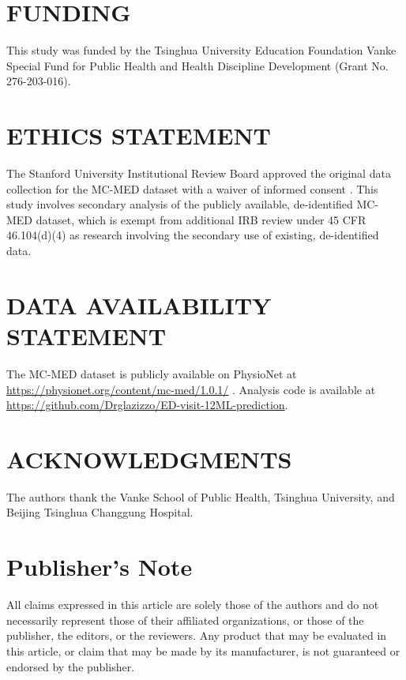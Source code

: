 \documentclass[harvard,article]{frontiersinFPHY_FAMS}
\begin{document}
\section{FUNDING}

This study was funded by the Tsinghua University Education Foundation Vanke Special Fund for Public Health and Health Discipline Development (Grant No. 276-203-016).

\section{ETHICS STATEMENT}

The Stanford University Institutional Review Board approved the original data collection for the MC-MED dataset with a waiver of informed consent \cite{kansal2025}. This study involves secondary analysis of the publicly available, de-identified MC-MED dataset, which is exempt from additional IRB review under 45 CFR 46.104(d)(4) as research involving the secondary use of existing, de-identified data.

\section{DATA AVAILABILITY STATEMENT}

The MC-MED dataset is publicly available on PhysioNet at \url{https://physionet.org/content/mc-med/1.0.1/} \cite{kansal2025}. Analysis code is available at \url{https://github.com/Drglazizzo/ED-visit-12ML-prediction}.

\section{ACKNOWLEDGMENTS}

The authors thank the Vanke School of Public Health, Tsinghua University, and Beijing Tsinghua Changgung Hospital.

\section{Publisher's Note}

All claims expressed in this article are solely those of the authors and do not necessarily represent those of their affiliated organizations, or those of the publisher, the editors, or the reviewers. Any product that may be evaluated in this article, or claim that may be made by its manufacturer, is not guaranteed or endorsed by the publisher.
\end{document}
